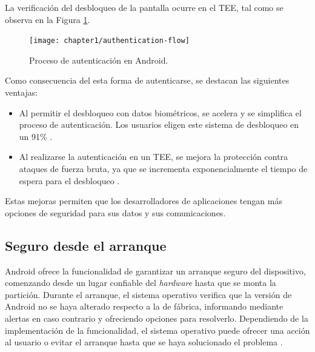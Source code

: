 La verificación del desbloqueo de la pantalla ocurre en el TEE, tal como se observa en la Figura \ref{fig:ch01:authentication-flow}.\\

\begin{figure}[htbp]
	\begin{center}
		\texttt{[image: chapter1/authentication-flow]}
		\caption{Proceso de autenticación en Android\cite{aossec}.}
		\label{fig:ch01:authentication-flow}
	\end{center}
\end{figure}
Como consecuencia del esta forma de autenticarse, se destacan las siguientes ventajas:
\begin{itemize}
    \item Al permitir el desbloqueo con datos biométricos, se acelera y se simplifica el proceso de autenticación. Los usuarios eligen este sistema de desbloqueo en un 91\% \cite{asreview2015}.
    \item Al realizarse la autenticación en un TEE, se mejora la protección contra ataques de fuerza bruta, ya que se incrementa exponencialmente el tiempo de espera para el desbloqueo \cite{asreview2015}.
\end{itemize}
Estas mejoras permiten que los desarrolladores de aplicaciones tengan más opciones de seguridad para sus datos y sus comunicaciones.
\subsection{Seguro desde el arranque}\label{fig:ch03:verify-boot}
Android ofrece la funcionalidad de garantizar un arranque seguro del dispositivo, comenzando desde un lugar confiable del \textit{hardware} hasta que se monta la partición. Durante el arranque, el sistema operativo verifica que la versión de Android no se haya alterado respecto a la de fábrica, informando mediante alertas en caso contrario y ofreciendo opciones para resolverlo. Dependiendo de la implementación de la funcionalidad, el sistema operativo puede ofrecer una acción al usuario o evitar el arranque hasta que se haya solucionado el problema \cite{aossec}.\\

